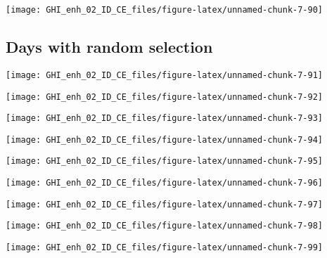 \documentclass[
  10pt,
  a4paper,oneside]{article}
\begin{document}
\begin{center}\texttt{[image: GHI\_enh\_02\_ID\_CE\_files/figure-latex/unnamed-chunk-7-90]} \end{center}

\FloatBarrier

\hypertarget{days-with-random-selection}{%
\subsection{Days with random selection}\label{days-with-random-selection}}

\begin{center}\texttt{[image: GHI\_enh\_02\_ID\_CE\_files/figure-latex/unnamed-chunk-7-91]} \end{center}

\begin{center}\texttt{[image: GHI\_enh\_02\_ID\_CE\_files/figure-latex/unnamed-chunk-7-92]} \end{center}

\begin{center}\texttt{[image: GHI\_enh\_02\_ID\_CE\_files/figure-latex/unnamed-chunk-7-93]} \end{center}

\begin{center}\texttt{[image: GHI\_enh\_02\_ID\_CE\_files/figure-latex/unnamed-chunk-7-94]} \end{center}

\begin{center}\texttt{[image: GHI\_enh\_02\_ID\_CE\_files/figure-latex/unnamed-chunk-7-95]} \end{center}

\begin{center}\texttt{[image: GHI\_enh\_02\_ID\_CE\_files/figure-latex/unnamed-chunk-7-96]} \end{center}

\begin{center}\texttt{[image: GHI\_enh\_02\_ID\_CE\_files/figure-latex/unnamed-chunk-7-97]} \end{center}

\begin{center}\texttt{[image: GHI\_enh\_02\_ID\_CE\_files/figure-latex/unnamed-chunk-7-98]} \end{center}

\begin{center}\texttt{[image: GHI\_enh\_02\_ID\_CE\_files/figure-latex/unnamed-chunk-7-99]} \end{center}
\end{document}
